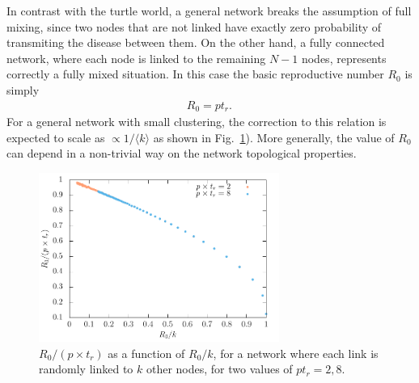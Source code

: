 \documentclass[10pt,letterpaper]{article}
\begin{document}
In contrast with the turtle world, a general network breaks the 
assumption of full mixing, since two nodes that are not
linked have exactly zero probability of transmiting the disease
between them. On the other hand, a fully connected network,  where each node is linked to the remaining
$N-1$ nodes, represents correctly a fully mixed situation.  
In this case the basic reproductive number $R_0$ is simply 
\begin{eqnarray}
R_0 = p t_r.\,
\label{eq:r0aa}
\end{eqnarray}
For a general network with small clustering, the correction to this relation is expected to scale as  $\propto 1/\langle k\rangle$ as shown in Fig.~\ref{fig:r0eff}).
More generally, the value of $R_0$ can depend in a non-trivial way on the network topological properties.

\begin{figure}
  \centering
  \includegraphics[width=0.7\textwidth]{r0eff.pdf}
  \caption{$R_0/(p \times t_r)$ as a function of $R_0/k$, for a network where each link is randomly linked to  $k$ other nodes, for two values
  of $p t_r=2, 8$.}
  \label{fig:r0eff}
\end{figure}
\end{document}
